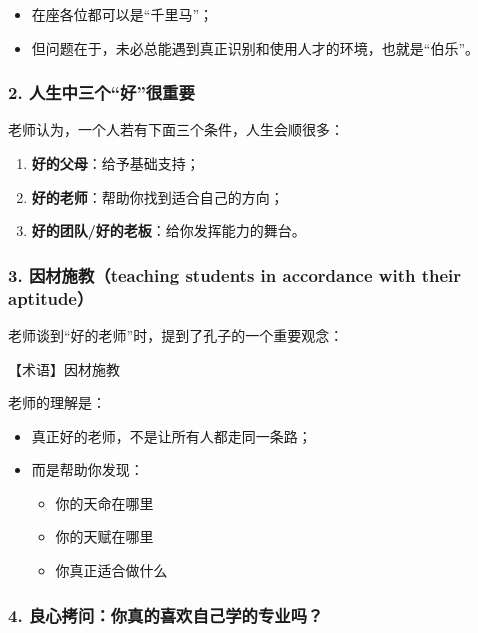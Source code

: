 \documentclass[
  chinese,
  9pt,
  a4paper,
]{ctexart}
\providecommand{\tightlist}{%
  \setlength{\itemsep}{0pt}\setlength{\parskip}{0pt}}
\begin{document}
\begin{itemize}
\tightlist
\item
  在座各位都可以是``千里马''；
\item
  但问题在于，未必总能遇到真正识别和使用人才的环境，也就是``伯乐''。
\end{itemize}

\subsubsection{2.
人生中三个``好''很重要}\label{ux4ebaux751fux4e2dux4e09ux4e2aux597dux5f88ux91cdux8981}

老师认为，一个人若有下面三个条件，人生会顺很多：

\begin{enumerate}
\def\labelenumi{\arabic{enumi}.}
\tightlist
\item
  \textbf{好的父母}：给予基础支持；
\item
  \textbf{好的老师}：帮助你找到适合自己的方向；
\item
  \textbf{好的团队/好的老板}：给你发挥能力的舞台。
\end{enumerate}

\subsubsection{3. 因材施教（teaching students in accordance with their
aptitude）}\label{ux56e0ux6750ux65bdux6559teaching-students-in-accordance-with-their-aptitude}

老师谈到``好的老师''时，提到了孔子的一个重要观念：

【术语】因材施教

老师的理解是：

\begin{itemize}
\item
  真正好的老师，不是让所有人都走同一条路；
\item
  而是帮助你发现：

  \begin{itemize}
  \tightlist
  \item
    你的天命在哪里
  \item
    你的天赋在哪里
  \item
    你真正适合做什么
  \end{itemize}
\end{itemize}

\subsubsection{4.
良心拷问：你真的喜欢自己学的专业吗？}\label{ux826fux5fc3ux62f7ux95eeux4f60ux771fux7684ux559cux6b22ux81eaux5df1ux5b66ux7684ux4e13ux4e1aux5417}
\end{document}

